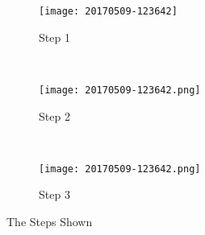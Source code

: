 \begin{figure}
    \begin{center}
    \begin{subfigure}[b]{0.3\textwidth}
        \texttt{[image: 20170509-123642]}
        \caption{Step 1}
        \label{fig:step1}
    \end{subfigure}
    ~   %
    \begin{subfigure}[b]{0.3\textwidth}
        \texttt{[image: 20170509-123642.png]}
        \caption{Step 2}
        \label{fig:step2}
    \end{subfigure}
    ~   %
    \begin{subfigure}[b]{0.3\textwidth}
        \texttt{[image: 20170509-123642.png]}
        \caption{Step 3}
        \label{fig:step3}
    \end{subfigure}
    \caption{The Steps Shown}\label{fig:threesteps}
    \end{center}
\end{figure}